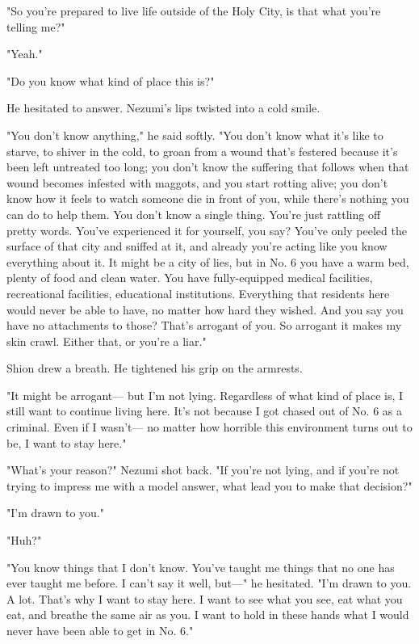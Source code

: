 "So you're prepared to live life outside of the Holy City, is that what
you're telling me?"

"Yeah."

"Do you know what kind of place this is?"

He hesitated to answer. Nezumi's lips twisted into a cold smile.

"You don't know anything," he said softly. "You don't know what it's
like to starve, to shiver in the cold, to groan from a wound that's
festered because it's been left untreated too long; you don't know the
suffering that follows when that wound becomes infested with maggots,
and you start rotting alive; you don't know how it feels to watch
someone die in front of you, while there's nothing you can do to help
them. You don't know a single thing. You're just rattling off pretty
words. You've experienced it for yourself, you say? You've only peeled
the surface of that city and sniffed at it, and already you're acting
like you know everything about it. It might be a city of lies, but in
No. 6 you have a warm bed, plenty of food and clean water. You have
fully-equipped medical facilities, recreational facilities, educational
institutions. Everything that residents here would never be able to
have, no matter how hard they wished. And you say you have no
attachments to those? That's arrogant of you. So arrogant it makes my
skin crawl. Either that, or you're a liar."

Shion drew a breath. He tightened his grip on the armrests.

"It might be arrogant--- but I'm not lying. Regardless of what kind of
place is, I still want to continue living here. It's not because I got
chased out of No. 6 as a criminal. Even if I wasn't--- no matter how
horrible this environment turns out to be, I want to stay here."

"What's your reason?" Nezumi shot back. "If you're not lying, and if
you're not trying to impress me with a model answer, what lead you to
make that decision?"

"I'm drawn to you."

"Huh?"

"You know things that I don't know. You've taught me things that no one
has ever taught me before. I can't say it well, but---" he hesitated. "I'm
drawn to you. A lot. That's why I want to stay here. I want to see what
you see, eat what you eat, and breathe the same air as you. I want to
hold in these hands what I would never have been able to get in No. 6."

